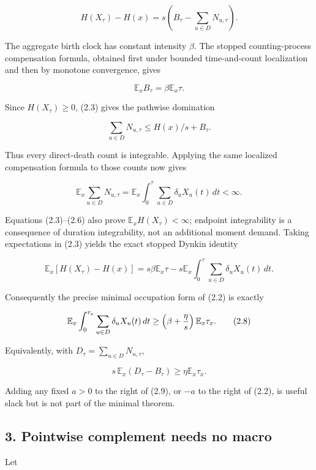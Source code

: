 \[
 H(X_\tau)-H(x)=s\left(B_\tau-
                    \sum_{u\in D}N_{u,\tau}\right).                 \tag{2.3}
\]

The aggregate birth clock has constant intensity \(\beta\). The stopped
counting-process compensation formula, obtained first under bounded
time-and-count localization and then by monotone convergence, gives

\[
 {\mathbb E}_xB_\tau=\beta{\mathbb E}_x\tau.                         \tag{2.4}
\]

Since \(H(X_\tau)\ge0\), (2.3) gives the pathwise domination

\[
 \sum_{u\in D}N_{u,\tau}\le H(x)/s+B_\tau.                          \tag{2.5}
\]

Thus every direct-death count is integrable. Applying the same localized
compensation formula to those counts now gives

\[
 {\mathbb E}_x\sum_{u\in D}N_{u,\tau}
 ={\mathbb E}_x\int_0^\tau
       \sum_{u\in D}\delta_uX_u(t)\,dt<\infty.                     \tag{2.6}
\]

Equations (2.3)--(2.6) also prove \({\mathbb E}_xH(X_\tau)<\infty\);
endpoint integrability is a consequence of duration integrability, not
an additional moment demand. Taking expectations in (2.3) yields the
exact stopped Dynkin identity

\[
 {\mathbb E}_x[H(X_\tau)-H(x)]
 =s\beta{\mathbb E}_x\tau
  -s{\mathbb E}_x\int_0^\tau
       \sum_{u\in D}\delta_uX_u(t)\,dt.                            \tag{2.7}
\]

Consequently the precise minimal occupation form of (2.2) is exactly

\[
 {\mathbb E}_x\int_0^{\tau_x}
       \sum_{u\in D}\delta_uX_u(t)\,dt
 \ge\left(\beta+{\eta\over s}\right){\mathbb E}_x\tau_x. \tag{2.8}
\]

Equivalently, with \(D_\tau=\sum_{u\in D}N_{u,\tau}\),

\[
                 s\,{\mathbb E}_x(D_\tau-B_\tau)
                         \ge\eta{\mathbb E}_x\tau_x.    \tag{2.9}
\]

Adding any fixed \(a>0\) to the right of (2.9), or \(-a\) to the right
of (2.2), is useful slack but is not part of the minimal theorem.

\subsection{3. Pointwise complement needs no
macro}

Let

